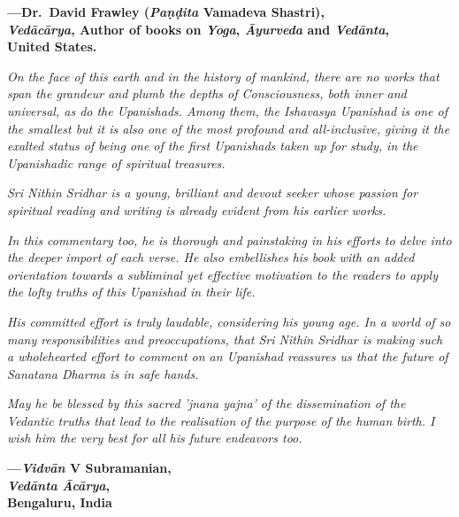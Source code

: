 \begin{flushright}
\textbf{---Dr.\ David Frawley (\emph{Paṇḍita} Vamadeva Shastri),}\\
\textbf{\emph{Vedācārya}, Author of books on \emph{Yoga}, \emph{Āyurveda} and \emph{Vedānta},}\\
\textbf{United States.}
\end{flushright}
\medskip


\emph{On the face of this earth and in the history of mankind, there are no works that span the grandeur and plumb the depths of Consciousness, both inner and universal, as do the Upanishads. Among them, the Ishavasya Upanishad is one of the smallest but it is also one of the most profound and all-inclusive, giving it the exalted status of being one of the first Upanishads taken up for study, in the Upanishadic range of spiritual treasures.}

\emph{Sri Nithin Sridhar is a young, brilliant and devout seeker whose passion for spiritual reading and writing is already evident from his earlier works.}

\emph{In this commentary too, he is thorough and painstaking in his efforts to delve into the deeper import of each verse. He also embellishes his book with an added orientation towards a subliminal yet effective motivation to the readers to apply the lofty truths of this Upanishad in their life.}

\emph{His committed effort is truly laudable, considering his young age. In a world of so many responsibilities and preoccupations, that Sri Nithin Sridhar is making such a wholehearted effort to comment on an Upanishad reassures us that the future of Sanatana Dharma is in safe hands.}

\emph{May he be blessed by this sacred 'jnana yajna' of the dissemination of the Vedantic truths that lead to the realisation of the purpose of the human birth. I wish him the very best for all his future endeavors too.}
\medskip

\begin{flushright}
\textbf{---\emph{Vidvān} V Subramanian,}\\
\textbf{\emph{Vedānta} \emph{Ācārya},}\\
\textbf{Bengaluru, India}
\end{flushright}

